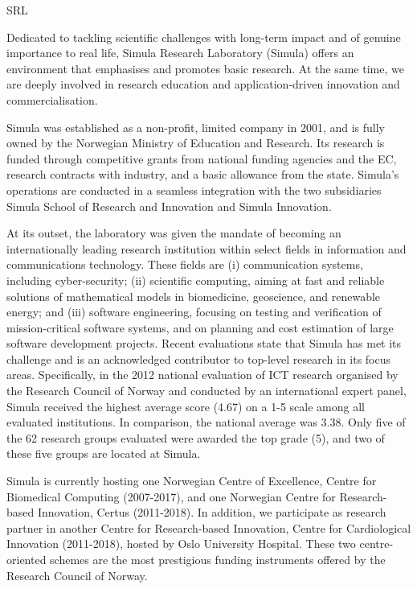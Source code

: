 \begin{sitedescription}{SRL}

Dedicated to tackling scientific challenges with long-term impact and of genuine importance to real life, Simula Research Laboratory (Simula) offers an environment that emphasises and promotes basic research. At the same time, we are deeply involved in research education and application-driven innovation and commercialisation.

Simula was established as a non-profit, limited company in 2001, and is fully owned by the Norwegian Ministry of Education and Research. Its research is funded through competitive grants from national funding agencies and the EC, research contracts with industry, and a basic allowance from the state.  Simula's operations are conducted in a seamless integration with the two subsidiaries Simula School of Research and Innovation and Simula Innovation.

At its outset, the laboratory was given the mandate of becoming an internationally leading research institution within select fields in information and communications technology. These fields are (i) communication systems, including cyber-security; (ii) scientific computing, aiming at fast and reliable solutions of mathematical models in biomedicine, geoscience, and renewable energy; and (iii) software engineering, focusing on testing and verification of mission-critical software systems, and on planning and cost estimation of large software development projects. Recent evaluations state that Simula has met its challenge and is an acknowledged contributor to top-level research in its focus areas. Specifically, in the 2012 national evaluation of ICT research organised by the Research Council of Norway and conducted by an international expert panel, Simula received the highest average score (4.67) on a 1-5 scale among all evaluated institutions.  In comparison, the national average was 3.38. Only five of the 62 research groups evaluated were awarded the top grade (5), and two of these five groups are located at Simula.

Simula is currently hosting one Norwegian Centre of Excellence, Centre for Biomedical Computing (2007-2017), and one Norwegian Centre for Research-based Innovation, Certus (2011-2018). In addition, we participate as research partner in another Centre for Research-based Innovation, Centre for Cardiological Innovation (2011-2018), hosted by Oslo University Hospital. These two centre-oriented schemes are the most prestigious funding instruments offered by the Research Council of Norway.


\end{sitedescription}
